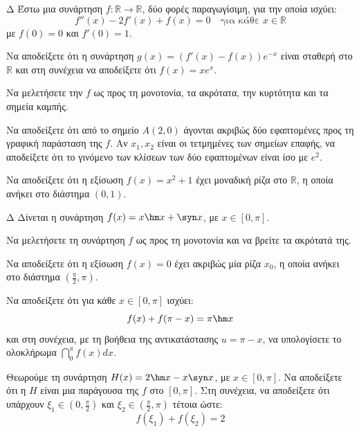 \begin{thema}{Δ}
Έστω μια συνάρτηση $f: \mathbb{R} \to \mathbb{R}$, δύο φορές παραγωγίσιμη, για την οποία ισχύει:
\[ f''(x) - 2f'(x) + f(x) = 0 \quad \text{για κάθε } x \in \mathbb{R} \]
με $f(0) = 0$ και $f'(0) = 1$.
\begin{erwthma}
    \item Να αποδείξετε ότι η συνάρτηση $g(x) = (f'(x) - f(x))e^{-x}$ είναι σταθερή στο $\mathbb{R}$ και στη συνέχεια να αποδείξετε ότι $f(x) = x e^x$.
    \item Να μελετήσετε την $f$ ως προς τη μονοτονία, τα ακρότατα, την κυρτότητα και τα σημεία καμπής.
    \item Να αποδείξετε ότι από το σημείο $A(2, 0)$ άγονται ακριβώς δύο εφαπτομένες προς τη γραφική παράσταση της $f$. Αν $x_1, x_2$ είναι οι τετμημένες των σημείων επαφής, να αποδείξετε ότι το γινόμενο των κλίσεων των δύο εφαπτομένων είναι ίσο με $e^2$.
    \item Να αποδείξετε ότι η εξίσωση $f(x) = x^2 + 1$ έχει μοναδική ρίζα στο $\mathbb{R}$, η οποία ανήκει στο διάστημα $(0, 1)$.
\end{erwthma}
\end{thema}

\begin{thema}{Δ}
Δίνεται η συνάρτηση $f(x) = x \hm x + \syn x$, με $x \in [0, \pi]$.
\begin{erwthma}
    \item Να μελετήσετε τη συνάρτηση $f$ ως προς τη μονοτονία και να βρείτε τα ακρότατά της.
    \item Να αποδείξετε ότι η εξίσωση $f(x) = 0$ έχει ακριβώς μία ρίζα $x_0$, η οποία ανήκει στο διάστημα $\displaystyle\left(\frac{\pi}{2}, \pi\right)$. 
    \item Να αποδείξετε ότι για κάθε $x \in [0, \pi]$ ισχύει:
    \[ f(x) + f(\pi - x) = \pi \hm x \]
    και στη συνέχεια, με τη βοήθεια της αντικατάστασης $u = \pi - x$, να υπολογίσετε το ολοκλήρωμα $\displaystyle \dint_0^\pi f(x) dx$.
    \item Θεωρούμε τη συνάρτηση $H(x) = 2\hm x - x \syn x$, με $x \in [0, \pi]$. Να αποδείξετε ότι η $H$ είναι μια παράγουσα της $f$ στο $[0, \pi]$. Στη συνέχεια, να αποδείξετε ότι υπάρχουν $\xi_1 \in \left(0, \frac{\pi}{2}\right)$ και $\xi_2 \in \left(\frac{\pi}{2}, \pi\right)$ τέτοια ώστε:
    \[ f(\xi_1) + f(\xi_2) = 2 \]
\end{erwthma}
\end{thema}

